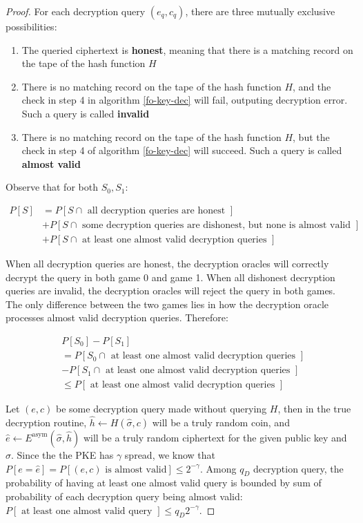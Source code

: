 \documentclass{article}
\begin{document}
\begin{proof}
    For each decryption query $(e_q, c_q)$, there are three mutually exclusive possibilities:

    \begin{enumerate}
        \item The queried ciphertext is \textbf{honest}, meaning that there is a matching record on the tape of the hash function $H$
        \item There is no matching record on the tape of the hash function $H$, and the check in step 4 in algorithm \ref{fo-key-dec} will fail, outputing decryption error. Such a query is called \textbf{invalid}
        \item There is no matching record on the tape of the hash function $H$, but the check in step 4 of algorithm \ref{fo-key-dec} will succeed. Such a query is called \textbf{almost valid}
    \end{enumerate}

    Observe that for both $S_0, S_1$:

    $$
    \begin{aligned}
        P[S] &= P[S \cap \text{ all decryption queries are honest }] \\
        &+ P[S \cap \text{ some decryption queries are dishonest, but none is almost valid }] \\
        &+ P[S \cap \text{ at least one almost valid decryption queries }]
    \end{aligned}
    $$

    When all decryption queries are honest, the decryption oracles will correctly decrypt the query in both game 0 and game 1. When all dishonest decryption queries are invalid, the decryption oracles will reject the query in both games. The only difference between the two games lies in how the decryption oracle processes almost valid decryption queries. Therefore:

    $$
    \begin{aligned}
        &P[S_0] - P[S_1] \\
        &= P[S_0 \cap \text{ at least one almost valid decryption queries }] \\
        &- P[S_1 \cap \text{ at least one almost valid decryption queries }] \\
        &\leq P[\text{ at least one almost valid decryption queries }]
    \end{aligned}
    $$

    Let $(e, c)$ be some decryption query made without querying $H$, then in the true decryption routine, $\hat{h} \leftarrow H(\hat{\sigma}, c)$ will be a truly random coin, and $\hat{e} \leftarrow E^\text{asym}(\hat{\sigma}, \hat{h})$ will be a truly random ciphertext for the given public key and $\hat{\sigma}$. Since the the PKE has $\gamma$ spread, we know that $P[e = \hat{e}] = P[(e, c) \text{ is almost valid}] \leq 2^{-\gamma}$. Among $q_D$ decryption query, the probability of having at least one almost valid query is bounded by sum of probability of each decryption query being almost valid: $P[\text{ at least one almost valid query }] \leq q_D 2^{-\gamma}$.
\end{proof}




\end{document}
